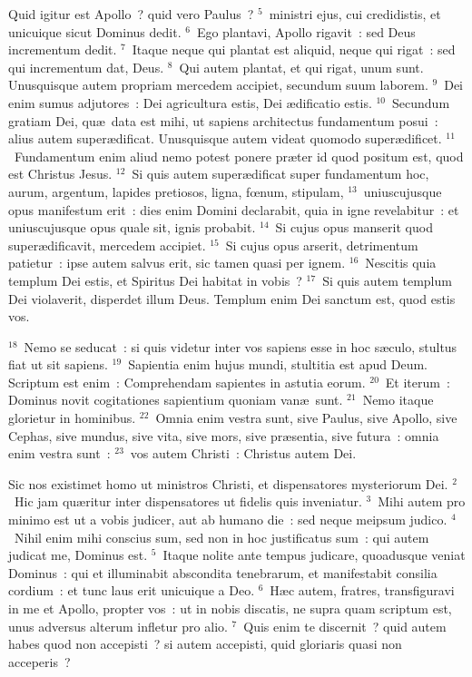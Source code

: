  Quid igitur est Apollo~? quid vero Paulus~?
${}^{5}$~ministri ejus, cui credidistis, et unicuique sicut Dominus dedit.
${}^{6}$~Ego plantavi, Apollo rigavit~: sed Deus incrementum dedit.
${}^{7}$~Itaque neque qui plantat est aliquid, neque qui rigat~: sed qui incrementum dat, Deus.
${}^{8}$~Qui autem plantat, et qui rigat, unum sunt. Unusquisque autem propriam mercedem accipiet, secundum suum laborem.
${}^{9}$~Dei enim sumus adjutores~: Dei agricultura estis, Dei \ae dificatio estis.
${}^{10}$~Secundum gratiam Dei, qu\ae\ data est mihi, ut sapiens architectus fundamentum posui~: alius autem super\ae dificat. Unusquisque autem videat quomodo super\ae dificet.
${}^{11}$~Fundamentum enim aliud nemo potest ponere pr\ae ter id quod positum est, quod est Christus Jesus.
${}^{12}$~Si quis autem super\ae dificat super fundamentum hoc, aurum, argentum, lapides pretiosos, ligna, fœnum, stipulam,
${}^{13}$~uniuscujusque opus manifestum erit~: dies enim Domini declarabit, quia in igne revelabitur~: et uniuscujusque opus quale sit, ignis probabit.
${}^{14}$~Si cujus opus manserit quod super\ae dificavit, mercedem accipiet.
${}^{15}$~Si cujus opus arserit, detrimentum patietur~: ipse autem salvus erit, sic tamen quasi per ignem.
${}^{16}$~Nescitis quia templum Dei estis, et Spiritus Dei habitat in vobis~?
${}^{17}$~Si quis autem templum Dei violaverit, disperdet illum Deus. Templum enim Dei sanctum est, quod estis vos.


${}^{18}$~Nemo se seducat~: si quis videtur inter vos sapiens esse in hoc s\ae culo, stultus fiat ut sit sapiens.
${}^{19}$~Sapientia enim hujus mundi, stultitia est apud Deum. Scriptum est enim~: Comprehendam sapientes in astutia eorum.
${}^{20}$~Et iterum~: Dominus novit cogitationes sapientium quoniam van\ae\ sunt.
${}^{21}$~Nemo itaque glorietur in hominibus.
${}^{22}$~Omnia enim vestra sunt, sive Paulus, sive Apollo, sive Cephas, sive mundus, sive vita, sive mors, sive pr\ae sentia, sive futura~: omnia enim vestra sunt~:
${}^{23}$~vos autem Christi~: Christus autem Dei.

\lettrine[lines=10,image=true,loversize=0.05,lraise=-0.03]{S}{}ic nos existimet homo ut ministros Christi, et dispensatores mysteriorum Dei.
${}^{2}$~Hic jam qu\ae ritur inter dispensatores ut fidelis quis inveniatur.
${}^{3}$~Mihi autem pro minimo est ut a vobis judicer, aut ab humano die~: sed neque meipsum judico.
${}^{4}$~Nihil enim mihi conscius sum, sed non in hoc justificatus sum~: qui autem judicat me, Dominus est.
${}^{5}$~Itaque nolite ante tempus judicare, quoadusque veniat Dominus~: qui et illuminabit abscondita tenebrarum, et manifestabit consilia cordium~: et tunc laus erit unicuique a Deo.
${}^{6}$~H\ae c autem, fratres, transfiguravi in me et Apollo, propter vos~: ut in nobis discatis, ne supra quam scriptum est, unus adversus alterum infletur pro alio.
${}^{7}$~Quis enim te discernit~? quid autem habes quod non accepisti~? si autem accepisti, quid gloriaris quasi non acceperis~?


